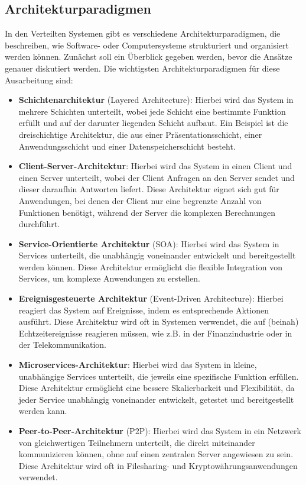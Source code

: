\subsection{Architekturparadigmen}

In den Verteilten Systemen gibt es verschiedene Architekturparadigmen, die beschreiben, wie Software- oder Computersysteme strukturiert und organisiert werden können. Zunächst soll ein Überblick gegeben werden, bevor die Ansätze genauer diskutiert werden. Die wichtigsten Architekturparadigmen für diese Ausarbeitung sind:
\begin{itemize}  
\item \textbf{Schichtenarchitektur} (Layered Architecture): Hierbei wird das System in mehrere Schichten unterteilt, wobei jede Schicht eine bestimmte Funktion erfüllt und auf der darunter liegenden Schicht aufbaut. Ein Beispiel ist die dreischichtige Architektur, die aus einer Präsentationsschicht, einer Anwendungsschicht und einer Datenspeicherschicht besteht.

\item \textbf{Client-Server-Architektur}: Hierbei wird das System in einen Client und einen Server unterteilt, wobei der Client Anfragen an den Server sendet und dieser daraufhin Antworten liefert. Diese Architektur eignet sich gut für Anwendungen, bei denen der Client nur eine begrenzte Anzahl von Funktionen benötigt, während der Server die komplexen Berechnungen durchführt.

\item \textbf{Service-Orientierte Architektur} (SOA): Hierbei wird das System in Services unterteilt, die unabhängig voneinander entwickelt und bereitgestellt werden können. Diese Architektur ermöglicht die flexible Integration von Services, um komplexe Anwendungen zu erstellen.

\item \textbf{Ereignisgesteuerte Architektur} (Event-Driven Architecture): Hierbei reagiert das System auf Ereignisse, indem es entsprechende Aktionen ausführt. Diese Architektur wird oft in Systemen verwendet, die auf (beinah) Echtzeitereignisse reagieren müssen, wie z.B. in der Finanzindustrie oder in der Telekommunikation.

\item \textbf{Microservices-Architektur}: Hierbei wird das System in kleine, unabhängige Services unterteilt, die jeweils eine spezifische Funktion erfüllen. Diese Architektur ermöglicht eine bessere Skalierbarkeit und Flexibilität, da jeder Service unabhängig voneinander entwickelt, getestet und bereitgestellt werden kann.

\item \textbf{Peer-to-Peer-Architektur} (P2P): Hierbei wird das System in ein Netzwerk von gleichwertigen Teilnehmern unterteilt, die direkt miteinander kommunizieren können, ohne auf einen zentralen Server angewiesen zu sein. Diese Architektur wird oft in Filesharing- und Kryptowährungsanwendungen verwendet.
\end{itemize}  
